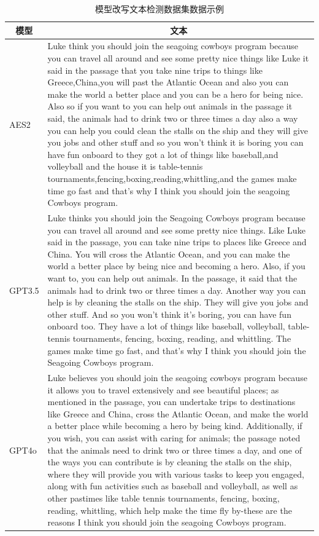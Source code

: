 \begin{table}[htbp]
\centering
\caption{模型改写文本检测数据集数据示例} \label{tab:TOSWT-eg}
\begin{tabular}{lp{12cm}}
\toprule
\multicolumn{1}{c}{\textbf{模型}} & \multicolumn{1}{c}{\textbf{文本}}  \\ \midrule
AES2                            & Luke think you should join the   seagoing cowboys program because you can travel all around and see some   pretty nice things like Luke it said in the passage that you take nine trips   to things like Greece,China,you will past the Atlantic Ocean and also you can   make the world a better place and you can be a hero for being nice. Also so if you want to you can help out animals in the passage it said, the   animals had to drink two or three times a day also a way you can help you   could clean the stalls on the ship and they will give you jobs and other   stuff and so you won't think it is boring you can have fun onboard to they   got a lot of things like baseball,and volleyball and the house it is   table-tennis tournaments,fencing,boxing,reading,whittling,and the games make   time go fast and that's why I think you should join the seagoing Cowboys   program. \\ \midrule
GPT3.5                          & Luke thinks you should   join the Seagoing Cowboys program because you can travel all around and see   some pretty nice things. Like Luke said in the passage, you can take nine   trips to places like Greece and China. You will cross the Atlantic Ocean, and   you can make the world a better place by being nice and becoming a   hero. Also, if you want to, you can help out animals. In the passage, it said   that the animals had to drink two or three times a day. Another way you can   help is by cleaning the stalls on the ship. They will give you jobs and other   stuff. And so you won't think it's boring, you can have fun onboard too. They   have a lot of things like baseball, volleyball, table-tennis tournaments,   fencing, boxing, reading, and whittling. The games make time go fast, and   that's why I think you should join the Seagoing Cowboys program.   \\ \midrule
GPT4o                           & Luke believes you should join the seagoing   cowboys program because it allows you to travel extensively and see beautiful   places; as mentioned in the passage, you can undertake trips to destinations   like Greece and China, cross the Atlantic Ocean, and make the world a better   place while becoming a hero by being kind. Additionally, if you wish, you can assist with caring for animals; the   passage noted that the animals need to drink two or three times a day, and   one of the ways you can contribute is by cleaning the stalls on the ship,   where they will provide you with various tasks to keep you engaged, along   with fun activities such as baseball and volleyball, as well as other   pastimes like table tennis tournaments, fencing, boxing, reading, whittling,   which help make the time fly by-these are the reasons I think you should join   the seagoing Cowboys program. \\ \midrule

\end{tabular}
\end{table}

